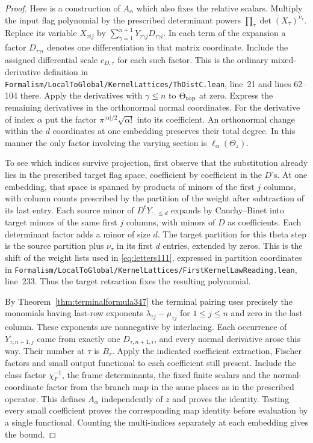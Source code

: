 \documentclass[a4paper,11pt]{article}
\theoremstyle{definition}
\theoremstyle{remark}
\newcommand{\srcloc}[2]{{\small\nolinkurl{#1.lean}}, line~#2}
\numberwithin{equation}{section}
\begin{document}
\begin{proof}
Here is a construction of \(A_\alpha\) which also fixes the
relative scalars. Multiply the input flag polynomial by the
prescribed determinant powers \(\prod_\tau\det(X_\tau)^{\nu_\tau}\).
Replace its variable \(X_{\tau i j}\) by
\(\sum_{\gamma=1}^{n+1}Y_{\tau\gamma j}D_{\tau\gamma i}\).
In each term of the expansion a factor \(D_{\tau\gamma i}\)
denotes one differentiation in that matrix coordinate. Include
the assigned differential scale \(c_{D,\tau}\) for each such
factor. This is the ordinary mixed-derivative definition in
\srcloc{Formalism/LocalToGlobal/KernelLattices/ThDistC}{21}
and lines 62--104 there. Apply the derivatives with
\(\gamma\le n\) to \(\Theta_{\rm top}\) at zero. Express the
remaining derivatives in the orthonormal normal coordinates.
For the derivative of index \(\alpha\) put the factor
\(\pi^{|\alpha|/2}\sqrt{\alpha!}\) into its coefficient.
An orthonormal change within the \(d\) coordinates at one
embedding preserves their total degree. In this manner the only
factor involving the varying section is \(\ell_\alpha(\Theta_z)\).

To see which indices survive projection, first observe that
the substitution already lies in the prescribed target flag
space, coefficient by coefficient in the \(D\)'s. At one
embedding, that space is spanned by products of minors of the
first \(j\) columns, with column counts prescribed by the
partition of the weight after subtraction of its last entry.
Each source minor of \(D^{t}Y_{:,\le d}\) expands by
Cauchy--Binet into target minors of the same first \(j\)
columns, with minors of \(D\) as coefficients. Each determinant
factor adds a minor of size \(d\). The target partition for this
theta step is the source partition plus \(\nu_\tau\) in its
first \(d\) entries, extended by zeros. This is the shift of the
weight lists used in \eqref{eq:letters111}, expressed in partition
coordinates in
\srcloc{Formalism/LocalToGlobal/KernelLattices/FirstKernelLawReading}{233}.
Thus the target retraction fixes the resulting polynomial.

By Theorem~\ref{thm:terminalformula347} the terminal pairing uses
precisely the monomials having last-row exponents
\(\lambda_{\tau j}-\mu_{\tau j}\) for \(1\le j\le n\) and
zero in the last column. These exponents are nonnegative by
interlacing. Each occurrence of \(Y_{\tau,n+1,j}\) came from
exactly one \(D_{\tau,n+1,i}\), and every normal derivative arose
this way. Their number at \(\tau\) is \(B_\tau\).
Apply the indicated coefficient extraction, Fischer factors and
small output functional to each coefficient still present.
Include the class factor \(\chi_F^{-1}\), the frame determinants,
the fixed finite scalars and the normal-coordinate factor from
the branch map in the same places as in the prescribed operator.
This defines \(A_\alpha\) independently of \(z\) and proves the
identity. Testing every small coefficient proves the corresponding
map identity before evaluation by a single functional. Counting
the multi-indices separately at each embedding gives the bound.


\end{proof}
\end{document}
